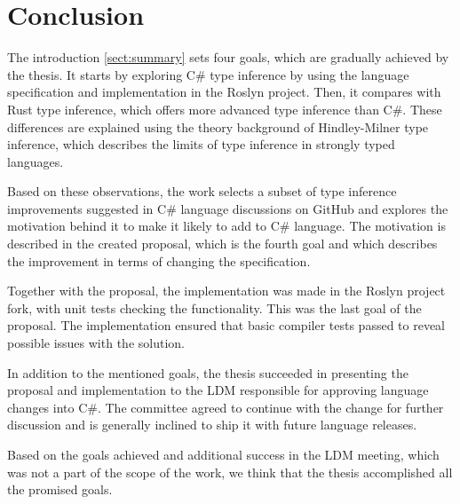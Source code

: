 \chapter*{Conclusion}

The introduction \ref{sect:summary} sets four goals, which are gradually achieved by the thesis. 
It starts by exploring C\# type inference by using the language specification and implementation in the Roslyn project. 
Then, it compares with Rust type inference, which offers more advanced type inference than C\#. 
These differences are explained using the theory background of Hindley-Milner type inference, which describes the limits of type inference in strongly typed languages.
\par
Based on these observations, the work selects a subset of type inference improvements suggested in C\# language discussions on GitHub and explores the motivation behind it to make it likely to add to C\# language. 
The motivation is described in the created proposal, which is the fourth goal and which describes the improvement in terms of changing the specification.
\par
Together with the proposal, the implementation was made in the Roslyn project fork, with unit tests checking the functionality. 
This was the last goal of the proposal. 
The implementation ensured that basic compiler tests passed to reveal possible issues with the solution.
\par
In addition to the mentioned goals, the thesis succeeded in presenting the proposal and implementation to the \ac{LDM} responsible for approving language changes into C\#. 
The committee agreed to continue with the change for further discussion and is generally inclined to ship it with future language releases.
\par
Based on the goals achieved and additional success in the \ac{LDM} meeting, which was not a part of the scope of the work, we think that the thesis accomplished all the promised goals.
